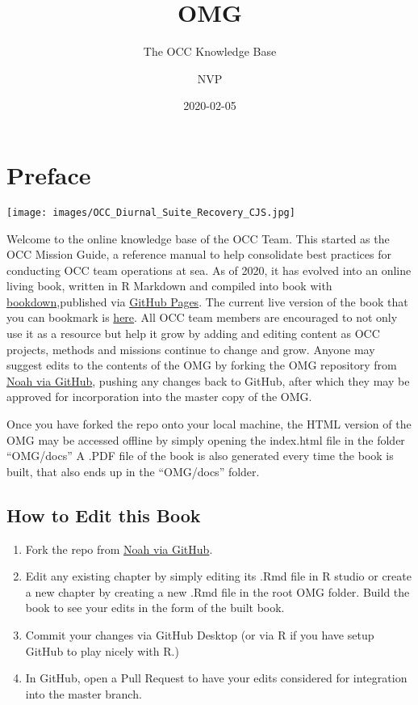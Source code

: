 \documentclass[]{book}
\title{OMG}
\subtitle{The OCC Knowledge Base}
\author{NVP}
\date{2020-02-05}
\providecommand{\tightlist}{%
  \setlength{\itemsep}{0pt}\setlength{\parskip}{0pt}}
\begin{document}
\maketitle

{
\setcounter{tocdepth}{1}
\tableofcontents
}
\chapter*{Preface}\label{preface}

\texttt{[image: images/OCC\_Diurnal\_Suite\_Recovery\_CJS.jpg]}

Welcome to the online knowledge base of the OCC Team. This started as
the OCC Mission Guide, a reference manual to help consolidate best
practices for conducting OCC team operations at sea. As of 2020, it has
evolved into an online living book, written in R Markdown and compiled
into book with
\href{https://bookdown.org/yihui/bookdown/}{bookdown},published via
\href{https://pages.github.com/}{GitHub Pages}. The current live version
of the book that you can bookmark is
\href{https://npomeroy.github.io/OMG/}{here}. All OCC team members are
encouraged to not only use it as a resource but help it grow by adding
and editing content as OCC projects, methods and missions continue to
change and grow. Anyone may suggest edits to the contents of the OMG by
forking the OMG repository from
\href{https://github.com/npomeroy/OMG}{Noah via GitHub}, pushing any
changes back to GitHub, after which they may be approved for
incorporation into the master copy of the OMG.

Once you have forked the repo onto your local machine, the HTML version
of the OMG may be accessed offline by simply opening the index.html file
in the folder ``OMG/docs'' A .PDF file of the book is also generated
every time the book is built, that also ends up in the ``OMG/docs''
folder.

\section*{How to Edit this Book}\label{how-to-edit-this-book}

\begin{enumerate}
\def\labelenumi{\arabic{enumi}.}
\tightlist
\item
  Fork the repo from \href{https://github.com/npomeroy/OMG}{Noah via
  GitHub}.
\item
  Edit any existing chapter by simply editing its .Rmd file in R studio
  or create a new chapter by creating a new .Rmd file in the root OMG
  folder. Build the book to see your edits in the form of the built
  book.
\item
  Commit your changes via GitHub Desktop (or via R if you have setup
  GitHub to play nicely with R.)
\item
  In GitHub, open a Pull Request to have your edits considered for
  integration into the master branch.
\end{enumerate}
\end{document}
